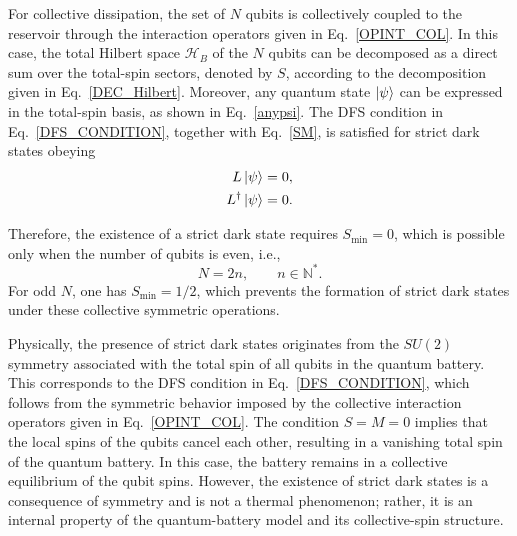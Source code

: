 \documentclass[aps,superscriptaddress,twocolumn,pre,longbibliography,floatfix]{revtex4-1}
\begin{document}
	For collective dissipation, the set of $N$ qubits is collectively coupled to the reservoir through the interaction operators given in Eq.~\eqref{OPINT_COL}. In this case, the total Hilbert space $\mathcal{H}_B$ of the $N$ qubits can be decomposed as a direct sum over the total-spin sectors, denoted by $S$, according to the decomposition given in Eq.~\eqref{DEC_Hilbert}. Moreover, any quantum state $\ket{\psi}$ can be expressed in the total-spin basis, as shown in Eq.~\eqref{anypsi}. The DFS condition in Eq.~\eqref{DFS_CONDITION}, together with Eq.~\eqref{SM}, is satisfied for strict dark states obeying
	\begin{align}
		L\ket{\psi} &= 0,\\
		L^\dagger\ket{\psi} &= 0.
	\end{align}
	
	Therefore, the existence of a strict dark state requires
	$S_{\min}=0$, which is possible only when the number of qubits is even, i.e.,
	\begin{equation} \label{N_even}
		N = 2n,
		\qquad
		n \in \mathbb{N}^{*}.
	\end{equation}
	For odd $N$, one has $S_{\min}=1/2$, which prevents the formation of strict dark states under these collective symmetric operations.
	
	Physically, the presence of strict dark states originates from the $SU(2)$ symmetry associated with the total spin of all qubits in the quantum battery. This corresponds to the DFS condition in Eq.~\eqref{DFS_CONDITION}, which follows from the symmetric behavior imposed by the collective interaction operators given in Eq.~\eqref{OPINT_COL}. The condition $S=M=0$ implies that the local spins of the qubits cancel each other, resulting in a vanishing total spin of the quantum battery. In this case, the battery remains in a collective equilibrium of the qubit spins. However, the existence of strict dark states is a consequence of symmetry and is not a thermal phenomenon; rather, it is an internal property of the quantum-battery model and its collective-spin structure.
	
\end{document}
